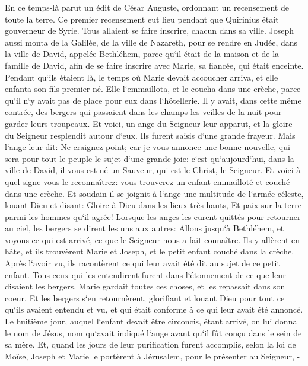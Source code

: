 \verse En ce temps-là parut un édit de César Auguste, ordonnant un recensement de toute la terre. 
\verse Ce premier recensement eut lieu pendant que Quirinius était gouverneur de Syrie. 
\verse Tous allaient se faire inscrire, chacun dans sa ville. 
\verse Joseph aussi monta de la Galilée, de la ville de Nazareth, pour se rendre en Judée, dans la ville de David, appelée Bethléhem, parce qu`il était de la maison et de la famille de David, 
\verse afin de se faire inscrire avec Marie, sa fiancée, qui était enceinte. 
\verse Pendant qu`ils étaient là, le temps où Marie devait accoucher arriva, 
\verse et elle enfanta son fils premier-né. Elle l`emmaillota, et le coucha dans une crèche, parce qu`il n`y avait pas de place pour eux dans l`hôtellerie. 
\verse Il y avait, dans cette même contrée, des bergers qui passaient dans les champs les veilles de la nuit pour garder leurs troupeaux. 
\verse Et voici, un ange du Seigneur leur apparut, et la gloire du Seigneur resplendit autour d`eux. Ils furent saisis d`une grande frayeur. 
\verse Mais l`ange leur dit: Ne craignez point; car je vous annonce une bonne nouvelle, qui sera pour tout le peuple le sujet d`une grande joie: 
\verse c`est qu`aujourd`hui, dans la ville de David, il vous est né un Sauveur, qui est le Christ, le Seigneur. 
\verse Et voici à quel signe vous le reconnaîtrez: vous trouverez un enfant emmailloté et couché dans une crèche. 
\verse Et soudain il se joignit à l`ange une multitude de l`armée céleste, louant Dieu et disant: 
\verse Gloire à Dieu dans les lieux très hauts, Et paix sur la terre parmi les hommes qu`il agrée! 
\verse Lorsque les anges les eurent quittés pour retourner au ciel, les bergers se dirent les uns aux autres: Allons jusqu`à Bethléhem, et voyons ce qui est arrivé, ce que le Seigneur nous a fait connaître. 
\verse Ils y allèrent en hâte, et ils trouvèrent Marie et Joseph, et le petit enfant couché dans la crèche. 
\verse Après l`avoir vu, ils racontèrent ce qui leur avait été dit au sujet de ce petit enfant. 
\verse Tous ceux qui les entendirent furent dans l`étonnement de ce que leur disaient les bergers. 
\verse Marie gardait toutes ces choses, et les repassait dans son coeur. 
\verse Et les bergers s`en retournèrent, glorifiant et louant Dieu pour tout ce qu`ils avaient entendu et vu, et qui était conforme à ce qui leur avait été annoncé. 
\verse Le huitième jour, auquel l`enfant devait être circoncis, étant arrivé, on lui donna le nom de Jésus, nom qu`avait indiqué l`ange avant qu`il fût conçu dans le sein de sa mère. 
\verse Et, quand les jours de leur purification furent accomplis, selon la loi de Moïse, Joseph et Marie le portèrent à Jérusalem, pour le présenter au Seigneur, - 
